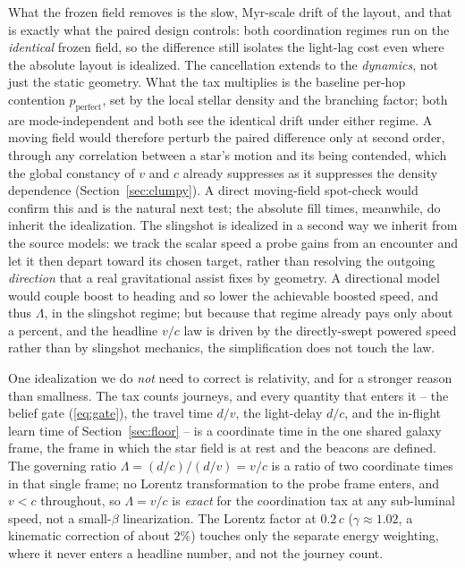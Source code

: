 What the frozen field removes is the slow, Myr-scale drift of the layout, and that is exactly what
the paired design controls: both coordination regimes run on the \emph{identical} frozen field, so
the difference still isolates the light-lag cost even where the absolute layout is idealized. The
cancellation extends to the \emph{dynamics}, not just the static geometry. What the tax multiplies
is the baseline per-hop contention $p_\text{perfect}$, set by the local stellar density and the
branching factor; both are mode-independent and both see the identical drift under either regime. A
moving field would therefore perturb the paired difference only at second order, through any
correlation between a star's motion and its being contended, which the global constancy of $v$ and
$c$ already suppresses as it suppresses the density dependence (Section~\ref{sec:clumpy}). A direct
moving-field spot-check would confirm this and is the natural next test; the absolute fill times,
meanwhile, do inherit the idealization. The
slingshot is idealized in a second way we inherit from the source models: we track the scalar speed a
probe gains from an encounter and let it then depart toward its chosen target, rather than resolving
the outgoing \emph{direction} that a real gravitational assist fixes by geometry. A directional model
would couple boost to heading and so lower the achievable boosted speed, and thus $\Lambda$, in the
slingshot regime; but because that regime already pays only about a percent, and the headline $v/c$
law is driven by the directly-swept powered speed rather than by slingshot mechanics, the
simplification does not touch the law.

One idealization we do \emph{not} need to correct is relativity, and for a stronger reason than
smallness. The tax counts journeys, and every quantity that enters it -- the belief gate
(\ref{eq:gate}), the travel time $d/v$, the light-delay $d/c$, and the in-flight learn time of
Section~\ref{sec:floor} -- is a coordinate time in the one shared galaxy frame, the frame in which
the star field is at rest and the beacons are defined. The governing ratio $\Lambda = (d/c)/(d/v) =
v/c$ is a ratio of two coordinate times in that single frame; no Lorentz transformation to the probe
frame enters, and $v < c$ throughout, so $\Lambda = v/c$ is \emph{exact} for the coordination tax at
any sub-luminal speed, not a small-$\beta$ linearization. The Lorentz factor at $0.2\,c$ ($\gamma
\approx 1.02$, a kinematic correction of about $2\%$) touches only the separate energy weighting,
where it never enters a headline number, and not the journey count.

